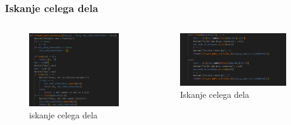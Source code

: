 \documentclass[a4paper,14pt]{beamer}
\begin{document}
\begin{frame}
    \frametitle{Iskanje celega dela}
    \begin{columns}
        \begin{column}{0.5\textwidth}
         \begin{figure}
             \centering
             \includegraphics[width = 1.1\textwidth]{Iskanje_celega_dela_1.png}
             \caption{iskanje celega dela }
         \end{figure}
         
        \end{column}
        \begin{column}{0.5\textwidth}
         \begin{figure}
             \centering
             \includegraphics[width = 1.2\textwidth]{Iskanje_celega_dela_2.png}
             \caption{Iskanje celega dela }
         \end{figure}
         
        \end{column}
    \end{columns}
\end{frame}
\end{document}
